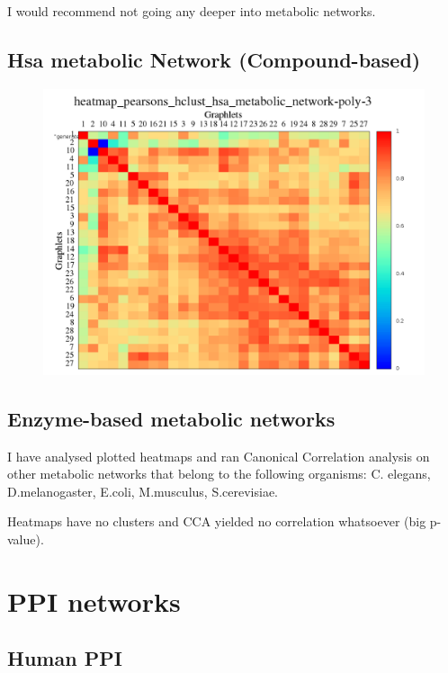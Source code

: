 \documentclass[11pt,a4paper,oneside]{report}
\begin{document}
I would recommend not going any deeper into metabolic networks.\\


\subsection*{Hsa metabolic Network (Compound-based)}

\begin{figure}[H]
  \centering
\includegraphics[scale=0.4]
{../code/final_results_norm1/hsa_metabolic_network/heatmap_pearsons_hclust_hsa_metabolic_network-poly-3.png}
\caption{}
\label{fig:hsa_meta}
\end{figure}

\subsection*{Enzyme-based metabolic networks}

I have analysed plotted heatmaps and ran Canonical Correlation analysis on other metabolic networks that belong to the following organisms: C. elegans, D.melanogaster, E.coli, M.musculus, S.cerevisiae. 

Heatmaps have no clusters and CCA yielded no correlation whatsoever (big p-value).

\section*{PPI networks}
\subsection*{Human PPI}
\end{document}
